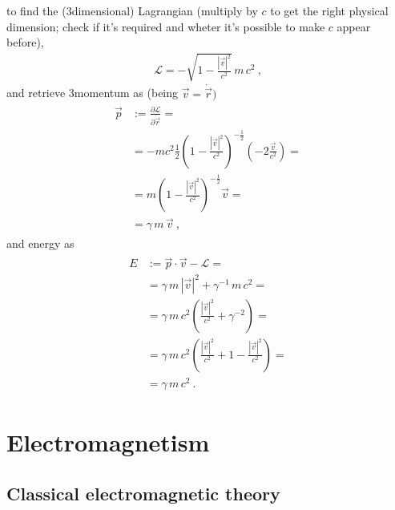 \documentclass[letterpaper,10pt,english]{jupyterBook}
\begin{document}
to find the (3\sphinxhyphen{}dimensional) Lagrangian (multiply by \(c\) to get the right physical dimension; check if it’s required and wheter it’s possible to make \(c\) appear before),
\begin{equation*}
\begin{split}\mathscr{L} = - \sqrt{1 - \frac{|\vec{v}|^2}{c^2}} \, m \, c^2 \ ,\end{split}
\end{equation*}
\sphinxAtStartPar
and retrieve 3\sphinxhyphen{}momentum as (being \(\vec{v} = \dot{\vec{r}})\)
\begin{equation*}
\begin{split}\begin{aligned}
  \vec{p} 
  & := \frac{\partial \mathscr{L}}{\partial \dot{\vec{r}}} = \\
  &  = - m c^2 \frac{1}{2} \left(1-\frac{|\vec{v}|^2}{c^2} \right)^{-\frac{1}{2}} \left( - 2 \frac{\vec{v}}{c^2}\right) = \\
  &  = m \left(1-\frac{|\vec{v}|^2}{c^2} \right)^{-\frac{1}{2}} \vec{v} = \\
  &  = \gamma \, m \, \vec{v} \ ,
\end{aligned}\end{split}
\end{equation*}
\sphinxAtStartPar
and energy as
\begin{equation*}
\begin{split}\begin{aligned}
  E
  & := \vec{p} \cdot \vec{v} - \mathscr{L} = \\
  & = \gamma \, m \, |\vec{v}|^2 + \gamma^{-1} \, m \, c^2 = \\
  & = \gamma \, m \, c^2 \left( \frac{|\vec{v}|^2}{c^2} + \gamma^{-2} \right) = \\
  & = \gamma \, m \, c^2 \left( \frac{|\vec{v}|^2}{c^2} + 1 - \frac{|\vec{v}|^2}{c^2} \right) = \\
  & = \gamma \, m \, c^2 \ .
\end{aligned}\end{split}
\end{equation*}

\section{Electromagnetism}
\label{\detokenize{ch/relativity-special/notes:electromagnetism}}

\subsection{Classical electromagnetic theory}
\label{\detokenize{ch/relativity-special/notes:classical-electromagnetic-theory}}
\end{document}
